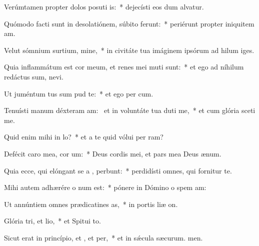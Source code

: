 \item Verúmtamen propter dolos posuti is:~* dejecísti eos dum alvatur.
\item Quómodo facti sunt in desolatiónem, súbito ferunt:~* periérunt propter iniquitem am.
\item Velut sómnium surtium, mine,~* in civitáte tua imáginem ipsórum ad hilum iges.
\item Quia inflammátum est cor meum, et renes mei muti sunt:~* et ego ad níhilum redáctus sum,  nevi.
\item Ut juméntum tus sum pud te:~* et ego per cum.
\item Tenuísti manum déxteram am:~\pscross{} et in voluntáte tua duti me,~* et cum glória sceti me.
\item Quid enim mihi  in lo?~* et a te quid vólui per ram?
\item Defécit caro mea,  cor um:~* Deus cordis mei, et pars mea Deus  ænum.
\item Quia ecce, qui elóngant se a , perbunt:~* perdidísti omnes, qui fornitur  te.
\item Mihi autem adhærére o num est:~* pónere in Dómino o spem am:
\item Ut annúntiem omnes prædicatines as,~* in portis liæ on.
\item Glória tri, et lio,~* et Spitui to.
\item Sicut erat in princípio, et , et per,~* et in sǽcula sæcurum. men.
